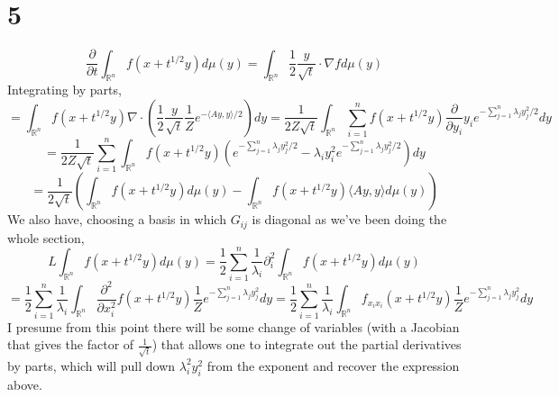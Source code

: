 \documentclass{article}
\begin{document}
\section*{5} %
\[
  \frac{\partial}{\partial t}\int_{\mathbb{R}^{n}}f(x+t^{1/2}y)d\mu(y)=\int_{\mathbb{R}^{n}}\frac{1}{2}\frac{y}{\sqrt{t}}\cdot\nabla f d\mu(y)
\]
Integrating by parts,
\[
  =\int_{\mathbb{R}^{n}}f(x+t^{1/2}y)\nabla\cdot \left(\frac{1}{2}\frac{y}{\sqrt{t}}\frac{1}{Z}e^{-\langle Ay,y \rangle/2}\right)dy
  =\frac{1}{2Z\sqrt{t}}\int_{\mathbb{R}^{n}}\sum_{i=1}^{n}f(x+t^{1/2}y)\frac{\partial}{\partial y_{i}}y_{i}e^{-\sum_{j=1}^{n}\lambda_{j}y_{j}^{2}/2}dy
\]
\[
  =\frac{1}{2Z\sqrt{t}}\sum_{i=1}^{n}\int_{\mathbb{R}^{n}}f(x+t^{1/2}y)\left( e^{-\sum_{j=1}^{n}\lambda_{j}y_{j}^{2}/2}
  -\lambda_{i}y_{i}^{2}e^{-\sum_{j=1}^{n}\lambda_{j}y_{j}^{2}/2}\right)dy
\]
\[
  =\frac{1}{2\sqrt{t}}\left( \int_{\mathbb{R}^{n}}f(x+t^{1/2}y)d\mu(y)-\int_{\mathbb{R}^{n}}f(x+t^{1/2}y)\langle Ay,y \rangle d\mu(y)\right)
\]
We also have, choosing a basis in which $G_{ij}$ is diagonal as we've been doing the whole section,
\[
  L\int_{\mathbb{R}^{n}}f(x+t^{1/2}y)d\mu(y)=\frac{1}{2}\sum_{i=1}^n\frac{1}{\lambda_{i}}\partial_{i}^{2}\int_{\mathbb{R}^{n}}f(x+t^{1/2}y)d\mu(y)
\]
\[
  =\frac{1}{2}\sum_{i=1}^{n}\frac{1}{\lambda_{i}}\int_{\mathbb{R}^{n}}\frac{\partial^{2}}{\partial x_{i}^{2}}
  f(x+t^{1/2}y)\frac{1}{Z}e^{-\sum_{j=1}^{n}\lambda_{j}y_{j}^{2}}dy
  =\frac{1}{2}\sum_{i=1}^{n}\frac{1}{\lambda_{i}}\int_{\mathbb{R}^{n}}
  f_{x_{i}x_{i}}(x+t^{1/2}y)\frac{1}{Z}e^{-\sum_{j=1}^{n}\lambda_{j}y_{j}^{2}}dy
\]
I presume from this point there will be some change of variables (with a Jacobian that gives the factor of $\frac{1}{\sqrt{t}}$) that
allows one to integrate out the partial derivatives by parts, which will pull down $\lambda_{i}^{2}y_{i}^{2}$ from the exponent and recover
the expression above.
\end{document}
